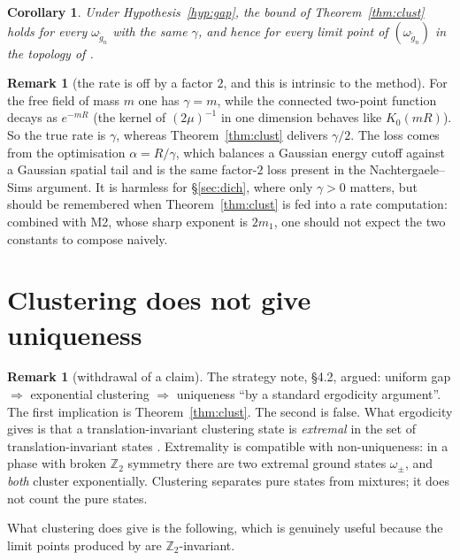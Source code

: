 \documentclass[11pt,a4paper]{article}
\theoremstyle{plain}
\newtheorem{corollary}[theorem]{Corollary}
\theoremstyle{definition}
\newtheorem{remark}[theorem]{Remark}
\newcommand{\Z}{\mathbb{Z}}
\begin{document}
\begin{corollary}\label{cor:unif}
Under Hypothesis~\ref{hyp:gap}, the bound of Theorem~\ref{thm:clust} holds for every
$\omega_{\tilde g_n}$ with the same $\gamma$, and hence for every limit point of
$(\omega_{\tilde g_n})$ in the topology of \cite[Cor.~4.3]{M0}.
\end{corollary}

\begin{remark}[the rate is off by a factor $2$, and this is intrinsic to the method]
\label{rem:factor2}
For the free field of mass $m$ one has $\gamma=m$, while the connected two-point function decays
as $e^{-mR}$ (the kernel of $(2\mu)^{-1}$ in one dimension behaves like $K_0(mR)$). So the true
rate is $\gamma$, whereas Theorem~\ref{thm:clust} delivers $\gamma/2$. The loss comes from the
optimisation $\alpha=R/\gamma$, which balances a Gaussian energy cutoff against a Gaussian
spatial tail and is the same factor-$2$ loss present in the Nachtergaele--Sims argument. It is
harmless for \S\ref{sec:dich}, where only $\gamma>0$ matters, but should be remembered when
Theorem~\ref{thm:clust} is fed into a rate computation: combined with M2, whose sharp exponent is
$2m_1$, one should not expect the two constants to compose naively.
\end{remark}

\section{Clustering does not give uniqueness}\label{sec:notuniq}

\begin{remark}[withdrawal of a claim]\label{rem:withdraw}
The strategy note, \S4.2, argued: uniform gap $\Rightarrow$ exponential clustering $\Rightarrow$
uniqueness ``by a standard ergodicity argument''. The first implication is
Theorem~\ref{thm:clust}. The second is false. What ergodicity gives is that a translation-invariant
clustering state is \emph{extremal} in the set of translation-invariant states
\cite[Thm.~4.3.17]{BR1}. Extremality is compatible with non-uniqueness: in a phase with broken
$\Z_2$ symmetry there are two extremal ground states $\omega_\pm$, and \emph{both} cluster
exponentially. Clustering separates pure states from mixtures; it does not count the pure states.
\end{remark}

What clustering does give is the following, which is genuinely useful because the limit points
produced by \cite{M0,M1} are $\Z_2$-invariant.
\end{document}
